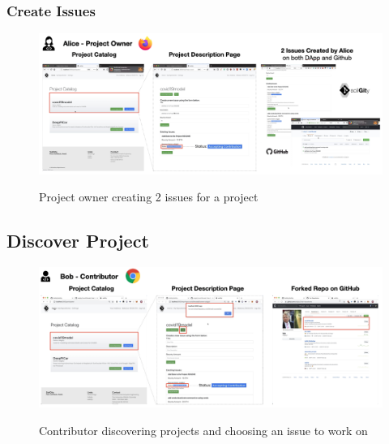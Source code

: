 \documentclass[12pt]{article}
\renewcommand{\_}{\kern-1.5pt\textunderscore\kern-1.5pt}
\begin{document}
\subsubsection{Create Issues}

\begin{figure}[H]
	\centering
	\includegraphics[width=16.5cm]{graphs/51. post_2.png}\\
	\caption{Project owner creating 2 issues for a project}
	\label{fig:post2}
\end{figure}



\subsection{Discover Project}

\begin{figure}[H]
	\centering
	\includegraphics[width=16.5cm]{graphs/52. discover_1.png}\\
	\caption{Contributor discovering projects and choosing an issue to work on}
	\label{fig:discover1}
\end{figure}
\end{document}

